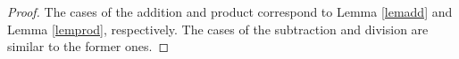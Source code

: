 \begin{proof}
The cases of the addition and product correspond to Lemma \ref{lemadd} and Lemma \ref{lemprod}, respectively.
The cases of the subtraction and  division are similar to the former ones.
\end{proof}



